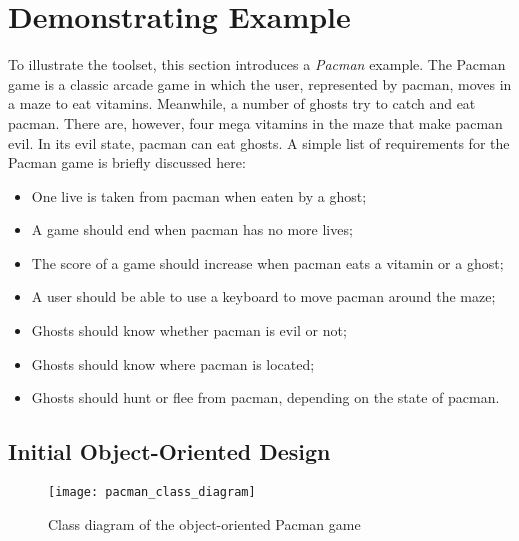 \section{Demonstrating Example}
\label{sec:demonstratingexample}

To illustrate the \Compose* toolset, this section introduces a \emph{Pacman} example.
The Pacman game is a classic arcade game in which the user, represented by pacman, moves in a maze to eat vitamins.
Meanwhile, a number of ghosts try to catch and eat pacman.
There are, however, four mega vitamins in the maze that make pacman evil.
In its evil state, pacman can eat ghosts.
A simple list of requirements for the Pacman game is briefly discussed here:
\begin{itemize}[noitemsep]
  \item One live is taken from pacman when eaten by a ghost;
  \item A game should end when pacman has no more lives;
  \item The score of a game should increase when pacman eats a vitamin or a ghost;
  \item A user should be able to use a keyboard to move pacman around the maze;
  \item Ghosts should know whether pacman is evil or not;
  \item Ghosts should know where pacman is located;
  \item Ghosts should hunt or flee from pacman, depending on the state of pacman.
\end{itemize}

\subsection{Initial Object-Oriented Design}

\begin{figure}[p]
  \centering
  \texttt{[image: pacman\_class\_diagram]}
  \caption{Class diagram of the object-oriented Pacman game}
  \label{fig:pacman_class_diagram}
\end{figure}
\afterpage{\clearpage}

